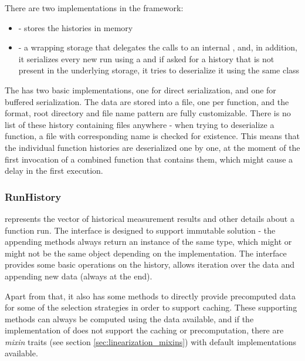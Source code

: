 There are two implementations in the framework:

\begin{itemize}
	\item{} - stores the histories in memory
	\item{} - a wrapping storage that delegates the calls to an internal , and, in addition, it serializes every new run using a  and if asked for a history that is not present in the underlying storage, it tries to deserialize it using the same class
\end{itemize}

The  has two basic implementations, one for direct serialization, and one for buffered serialization. The data are stored into a file, one per function, and the format, root directory and file name pattern are fully customizable. There is no list of these history containing files anywhere - when trying to deserialize a function, a file with corresponding name is checked for existence. This means that the individual function histories are deserialized one by one, at the moment of the first invocation of a combined function that contains them, which might cause a delay in the first execution.

\subsubsection{RunHistory}
\label{subsubsec:run_history}

 represents the vector of historical measurement results and other details about a function run. The interface is designed to support immutable solution - the appending methods always return an instance of the same type, which might or might not be the same object depending on the implementation. The interface provides some basic operations on the history, allows iteration over the data and appending new data (always at the end). 

Apart from that, it also has some methods to directly provide precomputed data for some of the selection strategies in order to support caching. These supporting methods can always be computed using the data available, and if the implementation of  does not support the caching or precomputation, there are \textit{mixin} traits (see section \ref{sec:linearization_mixins}) with default implementations available.

